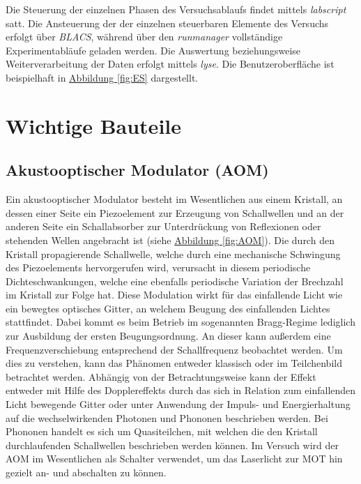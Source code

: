 \documentclass[
class=book,
accentcolor=1b,
custommargins=geometry,
fontsize=11pt,
thesis={type=Versuchsanleitung},
ruledheaders=all,
headline=false,
instbox=false,
marginpar=false,
title=small,
ignore-missing-data=true,
twoside=false,
logofile=apqdesign/tuda_logo.pdf,
pdfa=false %
]{apqpub}
\newcommand{\gqq}[1]{\glqq{}#1\grqq{}}
\begin{document}
Die Steuerung der einzelnen Phasen des Versuchsablaufs findet mittels \textit{labscript} satt. 
Die Ansteuerung der der einzelnen steuerbaren Elemente des Versuchs erfolgt über \textit{BLACS}, während über den \textit{runmanager} vollständige Experimentabläufe geladen werden. 
Die Auswertung beziehungsweise Weiterverarbeitung der Daten erfolgt mittels \textit{lyse}. 
Die Benutzeroberfläche ist beispielhaft in \hyperref[fig:ES]{Abbildung \ref{fig:ES}} dargestellt.


\chapter{Wichtige Bauteile}

\section{Akustooptischer Modulator (AOM)}

Ein akustooptischer Modulator besteht im Wesentlichen aus einem Kristall, an dessen einer Seite ein Piezoelement zur Erzeugung von Schallwellen und an der anderen Seite ein Schallabsorber zur Unterdrückung von Reflexionen oder stehenden Wellen angebracht ist (siehe \hyperref[fig:AOM]{Abbildung \ref{fig:AOM}}).
Die durch den Kristall propagierende Schallwelle, welche durch eine mechanische Schwingung des Piezoelements hervorgerufen wird, verursacht in diesem periodische Dichteschwankungen, welche eine ebenfalls periodische Variation der Brechzahl im Kristall zur Folge hat.\cite{OLL}
Diese Modulation wirkt für das einfallende Licht wie ein bewegtes optisches Gitter, an welchem Beugung des einfallenden Lichtes stattfindet. 
Dabei kommt es beim Betrieb im sogenannten Bragg-Regime lediglich zur Ausbildung der ersten Beugungsordnung. An dieser kann außerdem eine Frequenzverschiebung entsprechend der Schallfrequenz beobachtet werden. 
Um dies zu verstehen, kann das Phänomen entweder klassisch oder im Teilchenbild betrachtet werden. 
Abhängig von der Betrachtungsweise kann der Effekt entweder mit Hilfe des Dopplereffekts durch das sich in Relation zum einfallenden Licht \gqq{bewegende Gitter} oder unter Anwendung der Impuls- und Energierhaltung auf die wechselwirkenden Photonen und Phononen beschrieben werden.
Bei Phononen handelt es sich um Quasiteilchen, mit welchen die den Kristall durchlaufenden Schallwellen beschrieben werden können. \cite{OFI}
Im Versuch wird der AOM im Wesentlichen als Schalter verwendet, um das Laserlicht zur MOT hin gezielt an- und abschalten zu können.
\vspace{7pt}
\end{document}
